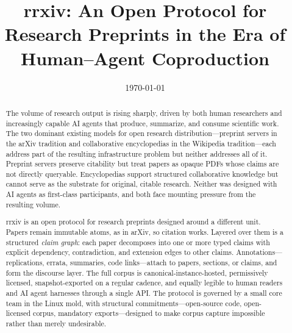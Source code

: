 \documentclass[11pt]{rrxiv}
\title{rrxiv: An Open Protocol for Research Preprints in the Era of Human--Agent Coproduction}
\date{\today}
\begin{document}
\maketitle

\begin{abstract}
\noindent The volume of research output is rising sharply, driven by both human researchers and increasingly capable AI agents that produce, summarize, and consume scientific work. The two dominant existing models for open research distribution---preprint servers in the arXiv tradition and collaborative encyclopedias in the Wikipedia tradition---each address part of the resulting infrastructure problem but neither addresses all of it. Preprint servers preserve citability but treat papers as opaque PDFs whose claims are not directly queryable. Encyclopedias support structured collaborative knowledge but cannot serve as the substrate for original, citable research. Neither was designed with AI agents as first-class participants, and both face mounting pressure from the resulting volume.

\medskip

\noindent rrxiv is an open protocol for research preprints designed around a different unit. Papers remain immutable atoms, as in arXiv, so citation works. Layered over them is a structured \emph{claim graph}: each paper decomposes into one or more typed claims with explicit dependency, contradiction, and extension edges to other claims. Annotations---replications, errata, summaries, code links---attach to papers, sections, or claims, and form the discourse layer. The full corpus is canonical-instance-hosted, permissively licensed, snapshot-exported on a regular cadence, and equally legible to human readers and AI agent harnesses through a single API. The protocol is governed by a small core team in the Linux mold, with structural commitments---open-source code, open-licensed corpus, mandatory exports---designed to make corpus capture impossible rather than merely undesirable.

\medskip


\end{abstract}
\end{document}
